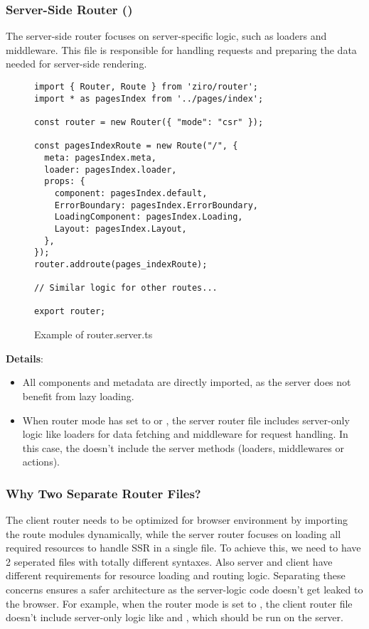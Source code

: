 \subsubsection{Server-Side Router ()}

The server-side router focuses on server-specific logic, such as loaders and middleware. This file is responsible for handling requests and preparing the data needed for server-side rendering.

\begin{figure}[H]
\begin{verbatim}
import { Router, Route } from 'ziro/router';
import * as pagesIndex from '../pages/index';

const router = new Router({ "mode": "csr" });

const pagesIndexRoute = new Route("/", {
  meta: pagesIndex.meta,
  loader: pagesIndex.loader,
  props: {
    component: pagesIndex.default,
    ErrorBoundary: pagesIndex.ErrorBoundary,
    LoadingComponent: pagesIndex.Loading,
    Layout: pagesIndex.Layout,
  },
});
router.addroute(pages_indexRoute);

// Similar logic for other routes...

export router;
\end{verbatim}
\caption{Example of router.server.ts}
\end{figure}

\textbf{Details}:
\begin{itemize}
  \item All components and metadata are directly imported, as the server does not benefit from lazy loading.
  \item When router mode has set to  or , the server router file includes server-only logic like loaders for data fetching and middleware for request handling. In this case, the  doesn't include the server methods (loaders, middlewares or actions).
\end{itemize}

\subsubsection{Why Two Separate Router Files?}
The client router needs to be optimized for browser environment by importing the route modules dynamically, while the server router focuses on loading all required resources to handle SSR in a single file. To achieve this, we need to have 2 seperated files with totally different syntaxes. Also server and client have different requirements for resource loading and routing logic. Separating these concerns ensures a safer architecture as the server-logic code doesn't get leaked to the browser. For example, when the router mode is set to , the client router file doesn't include server-only logic like  and , which should be run on the server.

